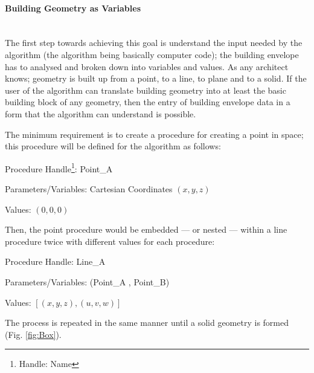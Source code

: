\documentclass[11pt,a4paper,oneside]{article}
\begin{document}
\begin{multicols}{2}
\paragraph{Building Geometry as Variables}\mbox{}\\[3mm]
The first step towards achieving this goal is understand the input needed by the algorithm (the algorithm being basically computer code); the building envelope has to analysed and broken down into variables and values. As any architect knows; geometry is built up from a point, to a line, to plane and to a solid. If the user of the algorithm can translate building geometry into at least the basic building block of any geometry, then the entry of building envelope data in a form that the algorithm can understand is possible.

The minimum requirement is to create a procedure for creating a point in space; this procedure will be defined for the algorithm as follows:
\begin{compactitem}[\footnotesize$\bullet$]
\item	{Procedure Handle\footnote{Handle: Name}:} Point\_A
\item	{Parameters/Variables:} Cartesian Coordinates $(x,y,z)$
\item	{Values:} $(0,0,0)$
\end{compactitem}
Then, the point procedure would be embedded --- or nested --- within a line procedure twice with different values for each procedure:
\begin{compactitem}[\footnotesize$\bullet$]
\item	{Procedure Handle:} Line\_A
\item	{Parameters/Variables:} ({Point\_A , Point\_B})
\item	{Values:} $[(x,y,z),(u,v,w)]$
\end{compactitem}
The process is repeated in the same manner until a solid geometry is formed (Fig. \ref{fig:Box}).


\end{multicols}
\end{document}
